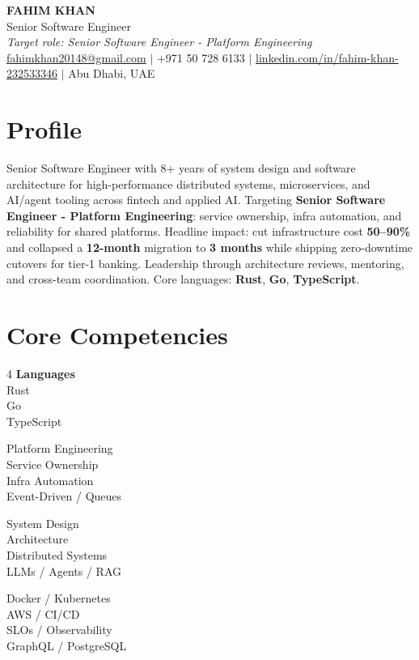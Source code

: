 \documentclass[a4paper,10.5pt]{article}
\begin{document}
\begin{center}
  {\LARGE\bfseries FAHIM KHAN}\\[4pt]
  {\large\color{accent} Senior Software Engineer}\\[4pt]
  {\small\textit{Target role: Senior Software Engineer - Platform Engineering}}\\[6pt]
  \small
  \href{mailto:fahimkhan20148@gmail.com}{fahimkhan20148@gmail.com}
  \quad$|$\quad
  +971 50 728 6133
  \quad$|$\quad
  \href{https://linkedin.com/in/fahim-khan-232533346}{linkedin.com/in/fahim-khan-232533346}
  \quad$|$\quad
  Abu Dhabi, UAE
\end{center}

\vspace{4pt}

\section{Profile}
Senior Software Engineer with 8+ years of system design and software architecture for high-performance distributed systems, microservices, and AI/agent tooling across fintech and applied AI. Targeting \textbf{Senior Software Engineer - Platform Engineering}: service ownership, infra automation, and reliability for shared platforms. Headline impact: cut infrastructure cost \textbf{50--90\%} and collapsed a \textbf{12-month} migration to \textbf{3 months} while shipping zero-downtime cutovers for tier-1 banking. Leadership through architecture reviews, mentoring, and cross-team coordination. Core languages: \textbf{Rust}, \textbf{Go}, \textbf{TypeScript}.

\section{Core Competencies}

\begin{multicols}{4}
\noindent
\textbf{Languages}\\
Rust\\
Go\\
TypeScript

\columnbreak
\noindent
Platform Engineering\\
Service Ownership\\
Infra Automation\\
Event-Driven / Queues

\columnbreak
\noindent
System Design\\
Architecture\\
Distributed Systems\\
LLMs / Agents / RAG

\columnbreak
\noindent
Docker / Kubernetes\\
AWS / CI/CD\\
SLOs / Observability\\
GraphQL / PostgreSQL
\end{multicols}
\end{document}

